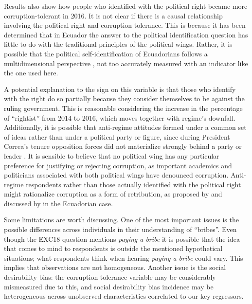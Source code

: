 \documentclass[12pt,a4]{article}\usepackage[]{graphicx}\usepackage[]{xcolor}
\begin{document}
Results also show how people who identified with the political right became more corruption-tolerant in 2016. It is not clear if there is a causal relationship involving the political right and corruption tolerance. This is because it has been determined that in Ecuador the answer to the political identification question has little to do with the traditional principles of the political wings. Rather, it is possible that the political self-identification of Ecuadorians follows a multidimensional perspective \parencite{Moncagatta.2020b}, not too accurately measured with an indicator like the one used here. 

A potential explanation to the sign on this variable is that those who identify with the right do so partially because they consider themselves to be against the ruling government. This is reasonable considering the increase in the percentage of \enquote{rightist} from 2014 to 2016, which moves together with regime's downfall. Additionally, it is possible that anti-regime attitudes formed under a common set of ideas rather than under a political party or figure, since during President Correa's tenure opposition forces did not materialize strongly behind a party or leader \parencite{Melendez.2017}. It is sensible to believe that no political wing has any particular preference for justifying or rejecting corruption, as important academics \parencite{Holcombe.2015} and politicians \parencite{Morris.2021} associated with both political wings have denounced corruption. Anti-regime respondents rather than those actually identified with the political right might rationalize corruption as a form of retribution, as proposed by \textcite{Ashforth.2003} and discussed by \textcite{Adoum.2000} in the Ecuadorian case.

Some limitations are worth discussing. One of the most important issues is the possible differences across individuals in their understanding of \enquote{bribes}. Even though the EXC18 question mentions \textit{paying a bribe} it is possible that the idea that comes to mind to respondents is outside the mentioned hypothetical situations; what respondents think when hearing \textit{paying a bribe} could vary. This implies that observations are not homogeneous. Another issue is the social desirability bias: the corruption tolerance variable may be considerably mismeasured due to this, and social desirability bias incidence may be heterogeneous across unobserved characteristics correlated to our key regressors.
\end{document}

